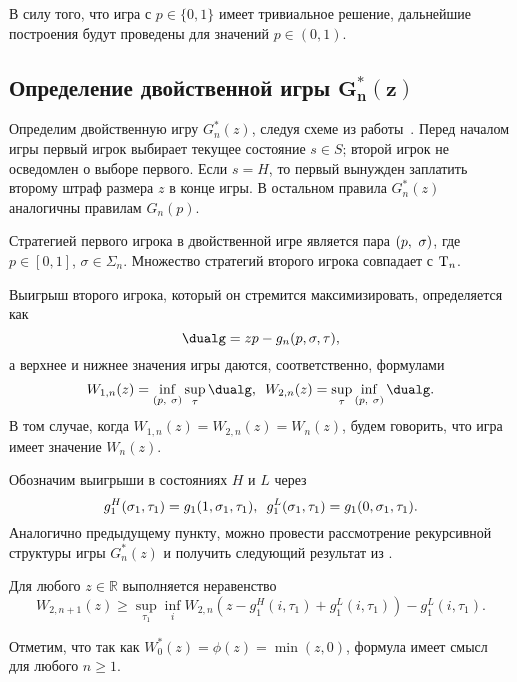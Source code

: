 {В силу того, что игра с $p \in \{0, 1\}$ имеет тривиальное решение, дальнейшие построения будут проведены для значений $p \in (0, 1)$.

\subsection{Определение двойственной игры $\mathbf{G^*_n(z)}$}
Определим двойственную игру $G^*_n(z)$, следуя схеме из работы~\cite{demeyer02}.
Перед началом игры первый игрок выбирает текущее состояние $s \in S$; второй игрок не осведомлен о выборе первого.
Если $s = H$, то первый вынужден заплатить второму штраф размера $z$ в конце игры.
В остальном правила $G^*_n(z)$ аналогичны правилам $G_n(p)$.

Стратегией первого игрока в двойственной игре является пара $(p,\ \sigma)$, где $p \in [0, 1]$, $\sigma \in \Sigma_n$.
Множество стратегий второго игрока совпадает с $\mathrm{T}_n$.

Выигрыш второго игрока, который он стремится максимизировать, определяется как
\begin{equation*}
  \dualg = z p - g_n(p, \sigma, \tau),
\end{equation*}
а верхнее и нижнее значения игры даются, соответственно, формулами
\begin{equation*}
  W_{1,n}(z) = \inf_{\dualFPS} \sup_\tau \dualg, \enskip
  W_{2,n}(z) = \sup_\tau \inf_{\dualFPS} \dualg.
\end{equation*}
В том случае, когда $W_{1,n}(z) = W_{2,n}(z) = W_n(z)$, будем говорить, что игра имеет значение $W_n(z)$.

Обозначим выигрыши в состояниях $H$ и $L$ через
\begin{equation*}
 g^H_1(\sigma_1, \tau_1) = g_1(1, \sigma_1, \tau_1), \enskip g^L_1(\sigma_1, \tau_1) = g_1(0, \sigma_1, \tau_1).
\end{equation*}
Аналогично предыдущему пункту, можно провести рассмотрение рекурсивной структуры игры $G^*_n(z)$ и получить следующий результат из \cite{demeyer02}.
\begin{lemma}\label{ch3:lem:low-bound-dual:general}
  Для любого $z \in \mathbb{R}$ выполняется неравенство
  \begin{equation}\label{ch3:eq:low-bound-dual:general}
    W_{2,n+1}(z) \geqslant \sup_{\tau_1} \inf_{i}
    W_{2,n}(z - g^H_1(i, \tau_1) + g_1^L(i, \tau_1)) - g^L_1(i, \tau_1).
  \end{equation}
\end{lemma}
Отметим, что так как $W^*_0(z) = \phi(z) = \min(z, 0)$, формула имеет смысл для любого $n \geqslant 1$.

}
